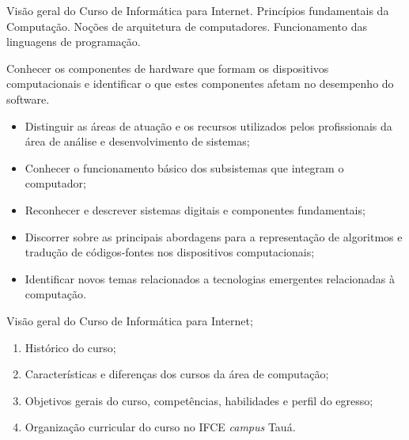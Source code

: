 \newenvironment{bibcomplementar}{
	\vspace{0.5em}
	\noindent\begin{tabularx}{\linewidth}{ X }
		\cellcolor{gray!10}\normalsize\textbf{BIBLIOGRAFIA COMPLEMENTAR}
	\end{tabularx}
	\vspace{-1em}
	\begin{flushleft}	
	\begin{itemize}[label={},leftmargin=0.1em, itemsep=0.75em]}{
	\end{itemize}
	\end{flushleft}
}

\begin{pud}
	
	
	\ementa
	Visão geral do Curso de Informática para Internet. Princípios fundamentais da Computação. Noções de arquitetura de computadores. Funcionamento das linguagens de programação.

	\objetivos
	Conhecer os componentes de hardware que formam os dispositivos computacionais e identificar o que estes componentes afetam no desempenho do software.
	\begin{itemize}
	  \item Distinguir as áreas de atuação e os recursos utilizados pelos profissionais da área de análise e desenvolvimento de sistemas;
	  \item Conhecer o funcionamento básico dos subsistemas que integram o computador;
	  \item Reconhecer e descrever sistemas digitais e componentes fundamentais;
	  \item Discorrer sobre as principais abordagens para a representação de algoritmos e tradução de códigos-fontes nos dispositivos computacionais;
	  \item Identificar novos temas relacionados a tecnologias emergentes relacionadas à computação.
	\end{itemize}
	
	
	
	\programa	
	\begin{description}[itemsep=0em]
	   
	   \item[UNIDADE I:]  Visão geral do Curso de Informática para Internet;
	   \begin{enumerate}[itemsep=0em, topsep=0em]
	     \item Histórico do curso;
	     \item Características e diferenças dos cursos da área de computação;
	     \item Objetivos gerais do curso, competências, habilidades e perfil do egresso;
	     \item Organização curricular do curso no IFCE \textit{campus} Tauá.
	   \end{enumerate}
	   

\end{description}
\end{pud}
